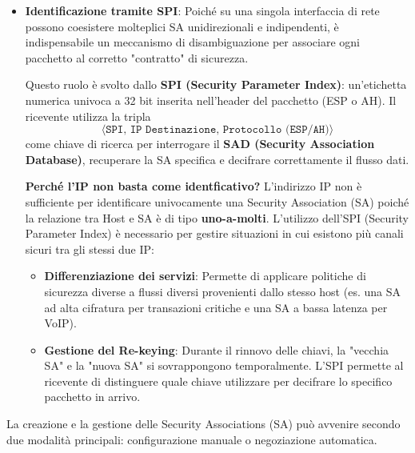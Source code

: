 \documentclass[a4paper, 11pt]{article}
\begin{document}
\begin{itemize}
    \item \textbf{Identificazione tramite SPI}:
    Poiché su una singola interfaccia di rete possono coesistere molteplici SA unidirezionali e indipendenti, è indispensabile un meccanismo di disambiguazione per associare ogni pacchetto al corretto "contratto" di sicurezza.
    
    Questo ruolo è svolto dallo \textbf{SPI (Security Parameter Index)}: un'etichetta numerica univoca a 32 bit inserita nell'header del pacchetto (ESP o AH). Il ricevente utilizza la tripla 
    \[
        \langle\texttt{SPI,\ IP Destinazione,\ Protocollo (ESP/AH)}\rangle
    \]
    come chiave di ricerca per interrogare il \textbf{SAD (Security Association Database)}, recuperare la SA specifica e decifrare correttamente il flusso dati.

    \textbf{Perché l'IP non basta come identficativo?}
    L'indirizzo IP non è sufficiente per identificare univocamente una Security Association (SA) poiché la relazione tra Host e SA è di tipo \textbf{uno-a-molti}.
    L'utilizzo dell'SPI (Security Parameter Index) è necessario per gestire situazioni in cui esistono più canali sicuri tra gli stessi due IP:
    \begin{itemize}
        \item \textbf{Differenziazione dei servizi}: Permette di applicare politiche di sicurezza diverse a flussi diversi provenienti dallo stesso host (es. una SA ad alta cifratura per transazioni critiche e una SA a bassa latenza per VoIP).
        \item \textbf{Gestione del Re-keying}: Durante il rinnovo delle chiavi, la "vecchia SA" e la "nuova SA" si sovrappongono temporalmente. L'SPI permette al ricevente di distinguere quale chiave utilizzare per decifrare lo specifico pacchetto in arrivo.
    \end{itemize}
\end{itemize}

La creazione e la gestione delle Security Associations (SA) può avvenire secondo due modalità principali: configurazione manuale o negoziazione automatica.
\end{document}
